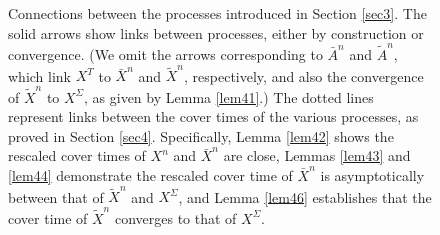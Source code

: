 \documentclass[a4paper, 11pt]{article}
\begin{document}
\begin{figure}[t]
\begin{center}
    \end{center}
 \caption{Connections between the processes introduced in Section \ref{sec3}. The solid arrows show links between processes, either by construction or convergence. (We omit the arrows corresponding to $\bar{A}^n$ and $\tilde{A}^n$, which link $X^T$ to $\bar{X}^n$ and $\tilde{X}^n$, respectively, and also the convergence of $\tilde{X}^n$ to $X^\Sigma$, as given by Lemma \ref{lem41}.) The dotted lines represent links between the cover times of the various processes, as proved in Section \ref{sec4}. Specifically, Lemma \ref{lem42} shows the rescaled cover times of $X^n$ and $\bar{X}^n$ are close, Lemmas \ref{lem43} and \ref{lem44} demonstrate the rescaled cover time of $\bar{X}^n$ is asymptotically between that of $\tilde{X}^n$ and ${X}^\Sigma$, and Lemma \ref{lem46} establishes that the cover time of $\tilde{X}^n$ converges to that of ${X}^\Sigma$.}\label{links}
\end{figure}
\end{document}
